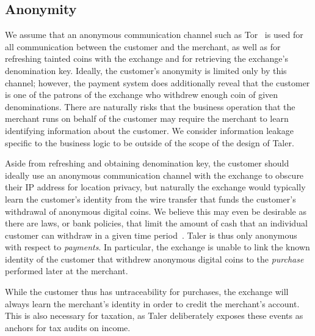 \documentclass[sigconf, authordraft]{acmart}
\begin{document}
\subsection{Anonymity}

We assume that an anonymous communication channel
such as Tor~\cite{tor-design} is
used for all communication between the customer and the merchant,
as well as for refreshing tainted coins with the exchange and for
retrieving the exchange's denomination key.
Ideally, the customer's anonymity is limited only by this channel;
however, the payment system does additionally reveal that the customer
is one of the patrons of the exchange who withdrew enough coin of
given denominations.
There are naturally risks that the business operation that the
merchant runs on behalf of the customer
may require the merchant to learn identifying information about the customer.
We consider information leakage specific to the business logic to be
outside of the scope of the design of Taler.

Aside from refreshing and obtaining denomination key, the customer
should ideally use an anonymous communication channel with the exchange
to obscure their IP address for location privacy, but naturally
the exchange would typically learn the customer's identity from the wire
transfer that funds the customer's withdrawal of anonymous digital coins.
We believe this may even be desirable as there are laws, or bank policies,
that limit the amount of cash that an individual customer can withdraw
in a given time period~\cite{france2015cash,greece2015cash}.
Taler is thus only anonymous with respect to {\em payments}.
In particular, the exchange
is unable to link the known identity of the customer that withdrew
anonymous digital coins to the {\em purchase} performed later at the
merchant.

While the customer thus has untraceability for purchases, the exchange will
always learn the merchant's identity in order to credit the merchant's
account.  This is also necessary for taxation, as Taler deliberately
exposes these events as anchors for tax audits on income.


\end{document}
